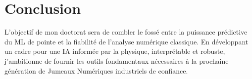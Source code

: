 \documentclass[11pt,a4paper]{article}
\begin{document}
\section{Conclusion}
L'objectif de mon doctorat sera de combler le fossé entre la puissance prédictive du ML de pointe et la fiabilité de l'analyse numérique classique. En développant un cadre pour une IA informée par la physique, interprétable et robuste, j'ambitionne de fournir les outils fondamentaux nécessaires à la prochaine génération de Jumeaux Numériques industriels de confiance.
\end{document}
